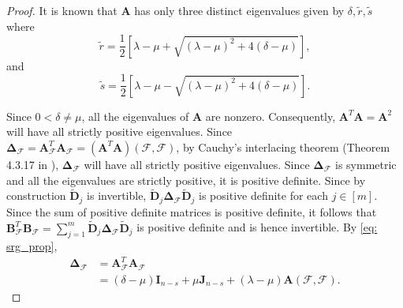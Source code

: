 \documentclass[journal,draftcls,onecolumn]{IEEEtran}
\theoremstyle{mystyle}
\newcommand{\bfD}{\mathbf{D}}
\newcommand{\bfA}{\mathbf{A}}
\newcommand{\bfI}{\mathbf{I}}
\newcommand{\cF}{\mathcal{F}}
\begin{document}
\begin{proof}%

It is known that $\mathbf{A}$ has only three distinct eigenvalues given by $\delta , \tilde{r}, \tilde{s}$ \cite{Brouwer_SRG} where 
\[ 
\tilde{r} = \frac{1}{2}[ \lambda - \mu + \sqrt{(\lambda - \mu)^2 + 4(\delta - \mu)}],\]
and \[ 
\tilde{s} =  \frac{1}{2}[ \lambda - \mu - \sqrt{(\lambda - \mu)^2 + 4(\delta - \mu)}].\]

Since $0<\delta \ne \mu$, all the eigenvalues of $\mathbf{A}$ are nonzero.
Consequently, $\mathbf{A}^T\mathbf{A} = \mathbf{A}^2$ will have all strictly positive eigenvalues. Since $\mathbf{\Delta}_{\mathcal{F}} = \bfA_{\mathcal{F}}^T \bfA_{\mathcal{F}} = (\mathbf{A}^T\mathbf{A})(\mathcal{F}, \mathcal{F})$, by Cauchy's interlacing theorem (Theorem 4.3.17 in \cite{horn2012matrix}),  $\mathbf{\Delta}_{\mathcal{F}}$ will have all  strictly positive eigenvalues. Since $\mathbf{\Delta}_{\mathcal{F}}$ is symmetric and all the eigenvalues are strictly positive, it is positive definite. Since by construction $\tilde{\bfD}_j$ is invertible, $\tilde{\bfD}_j \mathbf{\Delta}_{\cF} \tilde{\bfD}_j$ is positive definite for each $j \in [m]$. Since the sum of positive definite matrices is positive definite, it follows that $\mathbf{B}_{\mathcal{F}}^T\mathbf{B}_{\mathcal{F}}  =  \sum_{j = 1}^m \tilde{\bfD}_j\mathbf{\Delta}_{\mathcal{F}}\tilde{\bfD}_j$ is positive definite and is hence invertible. By \eqref{eq: srg_prop},
\begin{align*}
\mathbf{\Delta}_{\mathcal{F}} &= \mathbf{A}_{\mathcal{F}}^T \mathbf{A}_{\mathcal{F}}\\
& = (\delta - \mu) \mathbf{I}_{n-s} + \mu \mathbf{J}_{n-s} + (\lambda - \mu) \mathbf{A}(\mathcal{F}, \mathcal{F}).
\end{align*}


\end{proof}
\end{document}

